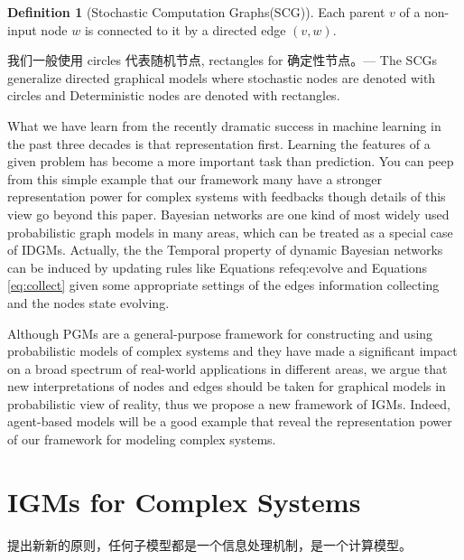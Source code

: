 \documentclass{article}
\theoremstyle{definition}
\newtheorem{definition}{Definition}[section]
\theoremstyle{remark}
\theoremstyle{definition}
\begin{document}
\begin{CJK*}{UTF8}{gbsn}
\begin{definition}[Stochastic Computation Graphs(SCG)]
Each parent $v$ of a non-input node $w$ is connected to it by a directed edge $(v, w)$.
\end{definition}

我们一般使用 circles 代表随机节点, rectangles for 确定性节点。---
The SCGs generalize directed graphical models where stochastic nodes are denoted with circles and Deterministic nodes are denoted with rectangles.





What we have learn from the recently dramatic success in machine learning in the past three decades is that representation first. Learning the features of a given problem has become a more important task than prediction. You can peep from this simple example that our framework many have a stronger representation power for complex systems with feedbacks though details of this view go beyond this paper. Bayesian networks are one kind of most widely used probabilistic graph models in many areas, which can be treated as a special case of IDGMs. Actually, the the Temporal property of dynamic Bayesian networks can be induced by updating rules like Equations ref{eq:evolve} and Equations \ref{eq:collect} given some appropriate settings of the edges information collecting and the nodes state evolving.

Although PGMs are a general-purpose framework for constructing and using probabilistic models of complex systems and they have made a significant impact on a broad spectrum of real-world applications in different areas, we argue that new interpretations of nodes and edges should be taken for graphical models in probabilistic view of reality, thus we propose a new framework of IGMs. Indeed, agent-based models will be a good example that reveal the representation power of our framework for modeling complex systems.



\section{IGMs for Complex Systems}

提出新新的原则，任何子模型都是一个信息处理机制，是一个计算模型。



\end{CJK*}
\end{document}
